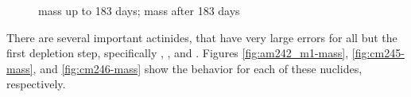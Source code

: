 \begin{figure}[htpb]
    \centering
    \caption{}
    \caption[ mass]{
      mass up to 183 days;
      mass after 183 days}
    \label{fig:cm242-mass}
\end{figure}

There are several important actinides, that
have very large errors for all but the first depletion step, specifically
, , and  . Figures
\ref{fig:am242_m1-mass}, \ref{fig:cm245-mass}, and \ref{fig:cm246-mass} show
the behavior for each of these nuclides, respectively.

